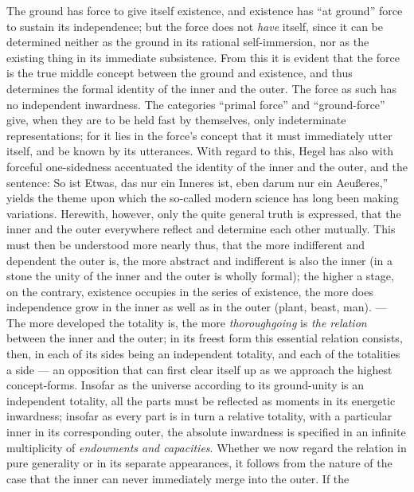 \documentclass[12pt]{book}
\begin{document}
The ground has force to give itself existence, and existence has ``at
ground'' force to sustain its independence; but the force does not
\emph{have} itself, since it can be determined neither as the ground in its
rational self-immersion, nor as the existing thing in its immediate
subsistence. From this it is evident that the force is the true middle
concept between the ground and existence, and thus determines the formal
identity of the inner and the outer. The force as such has no independent
inwardness. The categories ``primal force'' and ``ground-force'' give, when
they are to be held fast by themselves, only indeterminate representations;
for it lies in the force's concept that it must immediately utter itself,
and be known by its utterances. With regard to this, Hegel has also with
forceful one-sidedness accentuated the identity of the inner and the outer,
and the sentence: So ist Etwas, das nur ein Inneres ist, eben darum nur ein
Aeußeres,'' yields the theme upon which the so-called modern science has
long been making variations. Herewith, however, only the quite general truth
is expressed, that the inner and the outer everywhere reflect and determine
each other mutually. This must then be understood more nearly thus, that the
more indifferent and dependent the outer is, the more abstract and
indifferent is also the inner (in a stone the unity of the inner and the
outer is wholly formal); the higher a stage, on the contrary, existence
occupies in the series of existence, the more does independence grow in the
inner as well as in the outer (plant, beast, man). --- The more developed
the totality is, the more \emph{thoroughgoing} is \emph{the relation}
between the inner and the outer; in its freest form this essential relation
consists, then, in each of its sides being an independent totality, and each
of the totalities a side --- an opposition that can first clear itself up as
we approach the highest concept-forms. Insofar as the universe according to
its ground-unity is an independent totality, all the parts must be reflected
as moments in its energetic inwardness; insofar as every part is in turn a
relative totality, with a particular inner in its corresponding outer, the
absolute inwardness is specified in an infinite multiplicity of
\emph{endowments and capacities}. Whether we now regard the relation in pure
generality or in its separate appearances, it follows from the nature of the
case that the inner can never immediately merge into the outer. If the
\end{document}
